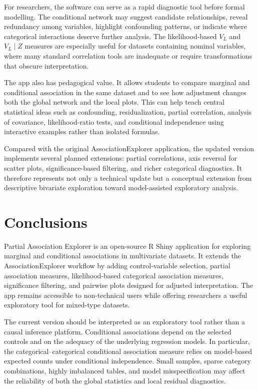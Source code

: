 \documentclass[11pt,a4paper]{article}
\begin{document}
For researchers, the software can serve as a rapid diagnostic tool before formal modelling. The conditional network may suggest candidate relationships, reveal redundancy among variables, highlight confounding patterns, or indicate where categorical interactions deserve further analysis. The likelihood-based $V_L$ and $V_L\mid Z$ measures are especially useful for datasets containing nominal variables, where many standard correlation tools are inadequate or require transformations that obscure interpretation.

The app also has pedagogical value. It allows students to compare marginal and conditional association in the same dataset and to see how adjustment changes both the global network and the local plots. This can help teach central statistical ideas such as confounding, residualization, partial correlation, analysis of covariance, likelihood-ratio tests, and conditional independence using interactive examples rather than isolated formulas.

Compared with the original AssociationExplorer application, the updated version implements several planned extensions: partial correlations, axis reversal for scatter plots, significance-based filtering, and richer categorical diagnostics. It therefore represents not only a technical update but a conceptual extension from descriptive bivariate exploration toward model-assisted exploratory analysis.

\section{Conclusions}
\label{sec:conclusion}

Partial Association Explorer is an open-source R Shiny application for exploring marginal and conditional associations in multivariate datasets. It extends the AssociationExplorer workflow by adding control-variable selection, partial association measures, likelihood-based categorical association measures, significance filtering, and pairwise plots designed for adjusted interpretation. The app remains accessible to non-technical users while offering researchers a useful exploratory tool for mixed-type datasets.

The current version should be interpreted as an exploratory tool rather than a causal inference platform. Conditional associations depend on the selected controls and on the adequacy of the underlying regression models. In particular, the categorical--categorical conditional association measure relies on model-based expected counts under conditional independence. Small samples, sparse category combinations, highly imbalanced tables, and model misspecification may affect the reliability of both the global statistics and local residual diagnostics.
\end{document}
